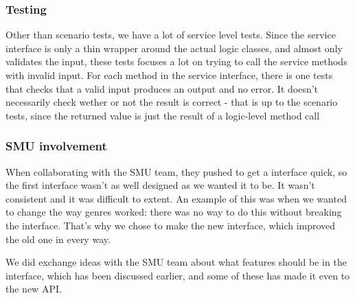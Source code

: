 \subsubsection{Testing}
Other than scenario tests, we have a lot of service level tests. Since the service interface is only a thin wrapper around the actual logic classes, and almost only validates the input, these tests focuses a lot on trying to call the service methods with invalid input. For each method in the service interface, there is one tests that checks that a valid input produces an output and no error. It doesn't necessarily check wether or not the result is correct - that is up to the scenario tests, since the returned value is just the result of a logic-level method call

\subsubsection{SMU involvement}
\label{Design_Service_Interface_SMU}
When collaborating with the SMU team, they pushed to get a interface quick, so the first interface wasn't as well designed as we wanted it to be. It wasn't consistent and it was difficult to extent. An example of this was when we wanted to change the way genres worked: there was no way to do this without breaking the interface. That's why we chose to make the new interface, which improved the old one in every way.

We did exchange ideas with the SMU team about what features should be in the interface, which has been discussed earlier, and some of these has made it even to the new API.
